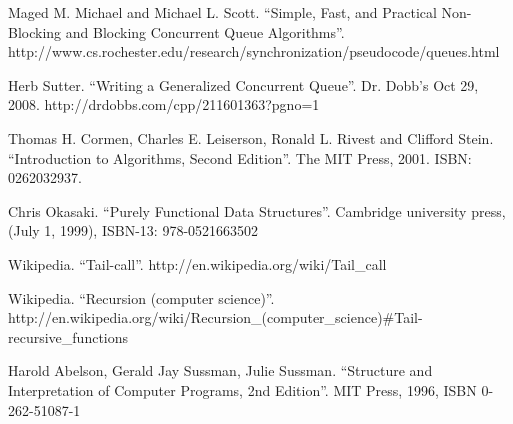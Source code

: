 \documentclass[UTF8]{article}
\begin{document}
\begin{thebibliography}{99}

Maged M. Michael and Michael L. Scott. ``Simple, Fast, and Practical Non-Blocking and Blocking Concurrent Queue Algorithms''. http://www.cs.rochester.edu/research/synchronization/pseudocode/queues.html

Herb Sutter. ``Writing a Generalized Concurrent Queue''. Dr. Dobb's Oct 29, 2008. http://drdobbs.com/cpp/211601363?pgno=1

Thomas H. Cormen, Charles E. Leiserson, Ronald L. Rivest and Clifford Stein. ``Introduction to Algorithms, Second Edition''. The MIT Press, 2001. ISBN: 0262032937.

Chris Okasaki. ``Purely Functional Data Structures''. Cambridge university press, (July 1, 1999), ISBN-13: 978-0521663502

Wikipedia. ``Tail-call''. http://en.wikipedia.org/wiki/Tail\_call

Wikipedia. ``Recursion (computer science)''. http://en.wikipedia.org/wiki/Recursion\_(computer\_science)\#Tail-recursive\_functions

Harold Abelson, Gerald Jay Sussman, Julie Sussman. ``Structure and Interpretation of Computer Programs, 2nd Edition''. MIT Press, 1996, ISBN 0-262-51087-1

\end{thebibliography}

\ifx\wholebook\relax \else
\end{document}
